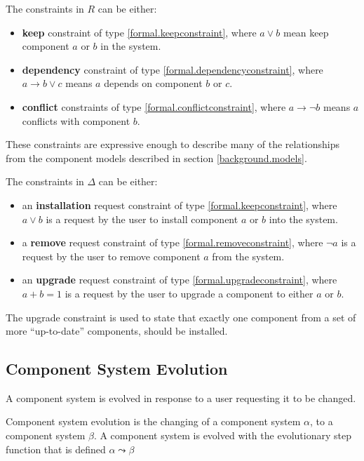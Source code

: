 The constraints in $R$ can be either: 
\begin{itemize}
  \item \textbf{keep} constraint of type \ref{formal.keepconstraint}, where $a \vee b$ mean keep component $a$ or $b$ in the system.
  \item \textbf{dependency} constraint of type \ref{formal.dependencyconstraint}, where $a \rightarrow b \vee c$ means $a$ depends on component $b$ or $c$.
  \item \textbf{conflict} constraints of type \ref{formal.conflictconstraint},  where $a \rightarrow \neg b$ means $a$ conflicts with component $b$.
\end{itemize}
These constraints are expressive enough to describe many of the relationships from the component models described in section \ref{background.models}.

The constraints in $\Delta$ can be either:
\begin{itemize}
  \item an \textbf{installation} request constraint of type \ref{formal.keepconstraint}, where $a \vee b$ is a request by the user to install component $a$ or $b$ into the system.
  \item a \textbf{remove} request constraint of type \ref{formal.removeconstraint}, where $\neg a$ is a request by the user to remove component $a$ from the system.
  \item an \textbf{upgrade} request constraint of type \ref{formal.upgradeconstraint}, where $a + b = 1$ is a request by the user to upgrade a component to either $a$ or $b$.
\end{itemize} 
The upgrade constraint is used to state that exactly one component from a set of more ``up-to-date'' components, should be installed.




\subsection{Component System Evolution}
\label{formal.evo}
A component system is evolved in response to a user requesting it to be changed. 
\begin{defs}
Component system evolution is the changing of a component system $\alpha$, to a component system $\beta$.
A component system is evolved with the evolutionary step function that is defined $\alpha \leadsto \beta$
\end{defs}

